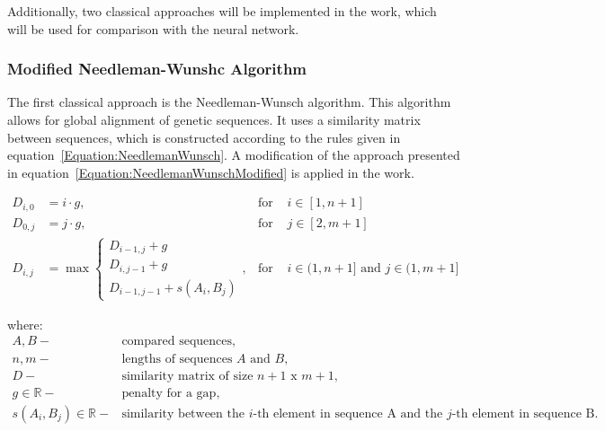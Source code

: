 \documentclass[pdflatex,sn-vancouver-num]{sn-jnl}%
\begin{document}
            Additionally, two classical approaches will be implemented in the work, which will be used for comparison with the neural network.

            \subsubsection{Modified Needleman-Wunshc Algorithm}
                The first classical approach is the Needleman-Wunsch algorithm. This algorithm allows for global alignment of genetic sequences. It uses a similarity matrix between sequences, which is constructed according to the rules given in equation~\eqref{Equation:NeedlemanWunsch}. A modification of the approach presented in equation~\eqref{Equation:NeedlemanWunschModified} is applied in the work.

                \begin{equation}
                    \begin{aligned}
                        D_{i,0} &= i \cdot g, & \text{for } & i \in [1, n + 1] \\
                        D_{0,j} &= j \cdot g, & \text{for } & j \in [2, m + 1] \\
                        D_{i,j} &= \max
                        \begin{cases}
                            D_{i - 1, j} + g \\
                            D_{i, j - 1} + g \\
                            D_{i - 1, j - 1} + s(A_i, B_j)
                        \end{cases}, & \text{for } & i \in (1, n + 1] \text{ and } j \in (1, m + 1]
                    \end{aligned}
                    \label{Equation:NeedlemanWunsch}
                \end{equation}

                where:
                \begin{align*}
                    A, B -& \text{compared sequences}, \\
                    n, m -& \text{lengths of sequences } A \text{ and } B, \\
                    D -& \text{similarity matrix of size } n + 1 \text{ x } m + 1, \\
                    g \in \mathbb{R} -& \text{penalty for a gap}, \\
                    s(A_i, B_j) \in \mathbb{R} -& \text{similarity between the } i\text{-th element in sequence A and the } j\text{-th element in sequence B}.
                \end{align*}
\end{document}
